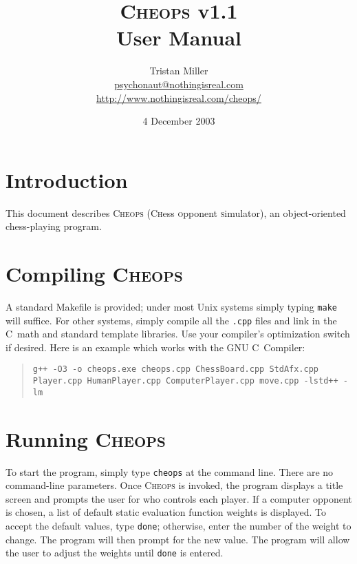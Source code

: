 \documentclass[a4paper]{article}
\def\CC{{C\nolinebreak[4]\hspace{-.05em}\raisebox{.4ex}{\tiny\bf ++}}}
\begin{document}
\title{\textsc{Cheops} v1.1\\User Manual}
\author{Tristan Miller\\ \url{psychonaut@nothingisreal.com}\\ \url{http://www.nothingisreal.com/cheops/}}
\date{4 December 2003}
\maketitle
\tableofcontents
\pagebreak

\section{Introduction}

This document describes \textsc{Cheops} (\textsc{Ch}ess
\textsc{o}pponent \textsc{s}imulator), an object-oriented
chess-playing program.

\section{Compiling \textsc{Cheops}}

A standard Makefile is provided; under most Unix systems simply typing
\texttt{make} will suffice.  For other systems, simply compile all the
\texttt{.cpp} files and link in the \CC\ math and standard template
libraries.  Use your compiler's optimization switch if desired.  Here
is an example which works with the GNU \CC\ Compiler:

\begin{quote}
\texttt{g++ -O3 -o cheops.exe cheops.cpp ChessBoard.cpp StdAfx.cpp Player.cpp HumanPlayer.cpp ComputerPlayer.cpp move.cpp -lstd++ -lm}
\end{quote}

\section{Running \textsc{Cheops}}

To start the program, simply type \texttt{cheops} at the command line.
There are no command-line parameters. Once \textsc{Cheops} is invoked,
the program displays a title screen and prompts the user for who
controls each player. If a computer opponent is chosen, a list of
default static evaluation function weights is displayed.  To accept
the default values, type \texttt{done}; otherwise, enter the number of
the weight to change. The program will then prompt for the new value.
The program will allow the user to adjust the weights until
\texttt{done} is entered.
\end{document}

